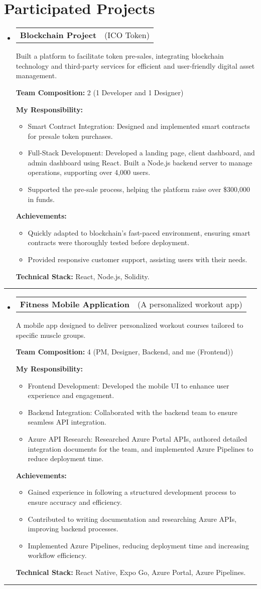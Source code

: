 \documentclass[letterpaper,11pt]{article}
\makeatletter
\newcommand{\resumeProjectTitle}[2]{
  \vspace{-2pt}\item
    \begin{tabular*}{1\textwidth}[t]{l @{\hskip 2pt} r}
      \textbf{#1} & \small #2 \\
    \end{tabular*}\vspace{2pt}
}
\newcommand{\resumeDesc}[1]{
  {#1\\ \vspace{0px}}
}
\newcommand{\resumeItem}[1]{
  \item{#1 \vspace{-2pt}}
}
\newcommand{\resumeItemListTitle}[1]{%
  \vspace{4pt} \textbf{#1} \vspace{-2pt}%
}
\newcommand{\resumeItemListStart}{\vspace{-4pt}\begin{itemize}[leftmargin=12px]}
\newcommand{\resumeItemListEnd}{\end{itemize}\vspace{-5pt}}
\newcommand{\resumeSubHeadingListStart}{\begin{itemize}[leftmargin=0pt, label={}]}
\newcommand{\resumeSubHeadingListEnd}{\end{itemize}\vspace{-5pt}}
\makeatother
\begin{document}
\section{Participated Projects}
\resumeSubHeadingListStart
\resumeProjectTitle{Blockchain Project}{(ICO Token)}
\resumeDesc{Built a platform to facilitate token pre-sales, integrating blockchain technology and third-party services for efficient and user-friendly digital asset management.}
\resumeItemListTitle{Team Composition:} 2 (1 Developer and 1 Designer)
\par
\resumeItemListTitle{My Responsibility:}
\resumeItemListStart
    \resumeItem{Smart Contract Integration: Designed and implemented smart contracts for presale token purchases.}
    \resumeItem{Full-Stack Development: Developed a landing page, client dashboard, and admin dashboard using React. Built a Node.js backend server to manage operations, supporting over 4,000 users.}
    \resumeItem{Supported the pre-sale process, helping the platform raise over \$300,000 in funds.}
\resumeItemListEnd
\resumeItemListTitle{Achievements:}
\resumeItemListStart
    \resumeItem{Quickly adapted to blockchain's fast-paced environment, ensuring smart contracts were thoroughly tested before deployment.}
    \resumeItem{Provided responsive customer support, assisting users with their needs.}
\resumeItemListEnd
\resumeItemListTitle{Technical Stack:} React, Node.js, Solidity.
\resumeSubHeadingListEnd
\noindent\rule{\textwidth}{0.4pt}
\resumeSubHeadingListStart
\resumeProjectTitle{Fitness Mobile Application}{(A personalized workout app)}
\resumeDesc{A mobile app designed to deliver personalized workout courses tailored to specific muscle groups.}
\resumeItemListTitle{Team Composition:} 4 (PM, Designer, Backend, and me (Frontend))
\par
\resumeItemListTitle{My Responsibility:}
\resumeItemListStart
    \resumeItem{Frontend Development: Developed the mobile UI to enhance user experience and engagement.}
    \resumeItem{Backend Integration: Collaborated with the backend team to ensure seamless API integration.}
    \resumeItem{Azure API Research: Researched Azure Portal APIs, authored detailed integration documents for the team, and implemented Azure Pipelines to reduce deployment time.}
\resumeItemListEnd
\resumeItemListTitle{Achievements:}
\resumeItemListStart
    \resumeItem{Gained experience in following a structured development process to ensure accuracy and efficiency.}
    \resumeItem{Contributed to writing documentation and researching Azure APIs, improving backend processes.}
    \resumeItem{Implemented Azure Pipelines, reducing deployment time and increasing workflow efficiency.}
\resumeItemListEnd
\resumeItemListTitle{Technical Stack:} React Native, Expo Go, Azure Portal, Azure Pipelines.
\resumeSubHeadingListEnd
\noindent\rule{\textwidth}{0.4pt}
\end{document}

